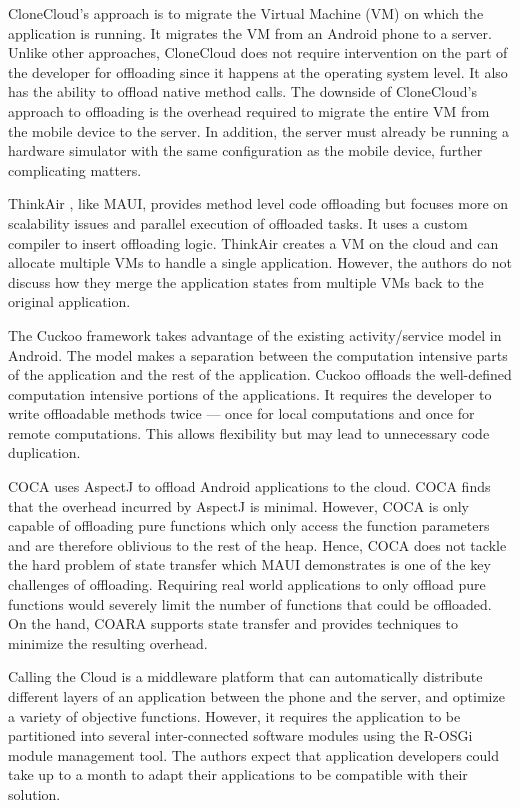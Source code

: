\documentclass[10pt,journal,cspaper,compsoc]{IEEEtran}
\begin{document}
CloneCloud's \cite{Chun:2011ty} approach is to migrate the Virtual Machine (VM) on which the application is running.  It migrates the VM from an Android phone to a server. Unlike other approaches, CloneCloud does not require intervention on the part of the developer for offloading since it happens at the operating system level.  It also has the ability to offload native method calls.  The downside of CloneCloud's approach to offloading is the overhead required to migrate the entire VM from the mobile device to the server.  In addition, the server must already be running a hardware simulator with the same configuration as the mobile device, further complicating matters.

ThinkAir \cite{Kosta:2012vx}, like MAUI, provides method level code offloading but focuses more on scalability issues and parallel execution of offloaded tasks.  It uses a custom compiler to insert offloading logic.  ThinkAir creates a VM on the cloud and can allocate multiple VMs to handle a single application.  However, the authors do not discuss how they merge the application states from multiple VMs back to the original application.

The Cuckoo \cite{Kemp:2012vn} framework takes advantage of the existing activity/service model in Android.  The model makes a separation between the computation intensive parts of the application and the rest of the application.  Cuckoo offloads the well-defined computation intensive portions of the applications.  It requires the developer to write offloadable methods twice --- once for local computations and once for remote computations.  This allows flexibility but may lead to unnecessary code duplication.

COCA \cite{Chen:2012cs} uses AspectJ to offload Android applications to the cloud. COCA finds that the overhead incurred by AspectJ is minimal.  However, COCA is only capable of offloading pure functions which only access the function parameters and are therefore oblivious to the rest of the heap.  Hence, COCA does not tackle the hard problem of state transfer which MAUI demonstrates is one of the key challenges of offloading. Requiring real world applications to only offload pure functions would severely limit the number of functions that could be offloaded.  On the hand, COARA supports state transfer and provides techniques to minimize the resulting overhead.

Calling the Cloud \cite{Giurgiu:2009vf} is a middleware platform that can automatically distribute different layers of an application between the phone and the server, and optimize a variety of objective functions.  However, it requires the application to be partitioned into several inter-connected software modules using the R-OSGi module management tool.  The authors expect that application developers could take up to a month to adapt their applications to be compatible with their solution.
\end{document}
